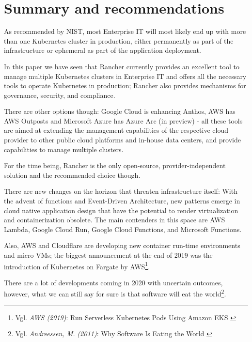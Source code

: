 %
%

\pagebreak
\section{Summary and recommendations}

\onehalfspacing

As recommended by NIST, most Enterprise IT will most likely end up with more than one Kubernetes cluster in production, either permanently as part of the infrastructure or ephemeral as part of the application deployment.

In this paper we have seen that Rancher currently provides an excellent tool to manage multiple Kubernetes clusters in Enterprise IT and offers all the necessary tools to operate Kubernetes in production; Rancher also provides mechanisms for governance, security, and compliance.

There are other options though: Google Cloud is enhancing Anthos, AWS has AWS Outposts and Microsoft Azure has Azure Arc (in preview) - all these tools are aimed at extending the management capabilities of the respective cloud provider to other public cloud platforms and in-house data centers, and provide capabilities to manage multiple clusters.

For the time being, Rancher is the only open-source, provider-independent solution and the recommended choice though.

There are new changes on the horizon that threaten infrastructure itself: With the advent of functions and Event-Driven Architecture, new patterns emerge in cloud native application design that have the potential to render virtualization and containerization obsolete. The main contenders in this space are AWS Lambda, Google Cloud Run, Google Cloud Functions, and Microsoft Functions.

Also, AWS and Cloudflare are developing new container run-time environments and micro-VMs; the biggest announcement at the end of 2019 was the introduction of Kubernetes on Fargate by AWS\footnote{Vgl. \textit{AWS (2019)}: Run Serverless Kubernetes Pods Using Amazon EKS \cite{eksFargate}}.

There are a lot of developments coming in 2020 with uncertain outcomes, however, what we can still say for sure is that software will eat the world\footnote{Vgl. \textit{Andreessen, M. (2011)}: Why Software Is Eating the World \cite{softwareEats}}.
